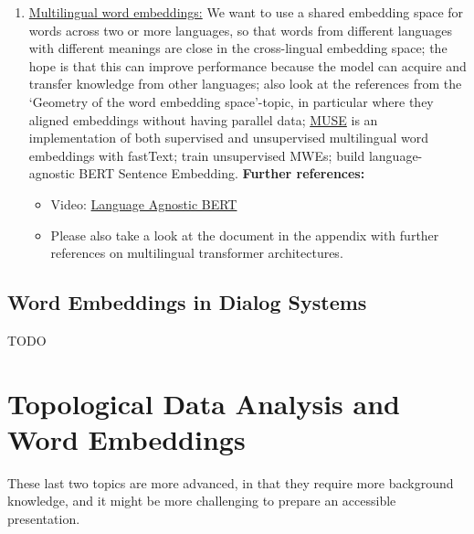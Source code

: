 \documentclass[11pt, a4paper]{amsart}
\begin{document}
\begin{enumerate}[resume]
    \item \underline{Multilingual word embeddings:}
    \newline
    We want to use a shared embedding space for words across two or more languages, so that words from different languages with different meanings are close in the cross-lingual embedding space;
    the hope is that this can improve performance because the model can acquire and transfer knowledge from other languages;
    also look at the references from the `Geometry of the word embedding space'-topic, in particular \cite{DBLP:journals/corr/abs-1710-04087} where they aligned embeddings without having parallel data;
    \href{https://github.com/facebookresearch/MUSE}{MUSE} is an implementation of both supervised and unsupervised multilingual word embeddings with fastText;
    \cite{DBLP:journals/corr/abs-1808-08933} train unsupervised MWEs;
    \cite{DBLP:journals/corr/abs-2007-01852} build language-agnostic BERT Sentence Embedding.
    \newline
    \textbf{Further references:}
    \begin{itemize}
        \item Video: \href{https://youtu.be/7tAWk_Coj-s}{Language Agnostic BERT}
        \item Please also take a look at the document in the appendix with further references on multilingual transformer architectures.
    \end{itemize}
\end{enumerate}

\subsection{Word Embeddings in Dialog Systems}

TODO

\section{Topological Data Analysis and Word Embeddings}

These last two topics are more advanced, in that they require more background knowledge, and it might be more challenging to prepare an accessible presentation.
\end{document}
